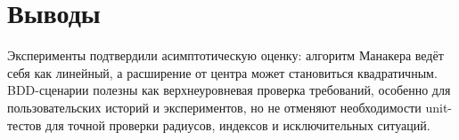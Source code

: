 \section{Выводы} \label{ch3:conclusion}

Эксперименты подтвердили асимптотическую оценку: алгоритм Манакера ведёт себя как линейный, а расширение от центра может становиться квадратичным. BDD-сценарии полезны как верхнеуровневая проверка требований, особенно для пользовательских историй и экспериментов, но не отменяют необходимости unit-тестов для точной проверки радиусов, индексов и исключительных ситуаций.
